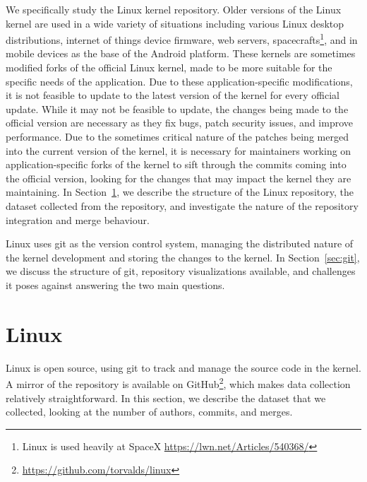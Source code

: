 We specifically study the Linux kernel repository. Older versions of the
Linux kernel are used in a wide variety of situations including various
Linux desktop distributions, internet of things device firmware, web
servers, spacecrafts\footnote{Linux is used heavily at SpaceX
  \url{https://lwn.net/Articles/540368/}}, and in mobile devices as the
base of the Android platform. These kernels are sometimes modified forks
of the official Linux kernel, made to be more suitable for the specific
needs of the application. Due to these application-specific
modifications, it is not feasible to update to the latest version of the
kernel for every official update. While it may not be feasible to
update, the changes being made to the official version are necessary as
they fix bugs, patch security issues, and improve performance. Due to
the sometimes critical nature of the patches being merged into the
current version of the kernel, it is necessary for maintainers working
on application-specific forks of the kernel to sift through the commits
coming into the official version, looking for the changes that may
impact the kernel they are maintaining. In Section~\ref{sec:linux}, we
describe the structure of the Linux repository, the dataset collected
from the repository, and investigate the nature of the repository
integration and merge behaviour.

Linux uses git as the version control system, managing the distributed
nature of the kernel development and storing the changes to the kernel.
In Section~\ref{sec:git}, we discuss the structure of git, repository
visualizations available, and challenges it poses against answering the
two main questions.

\section{Linux}\label{sec:linux}

Linux is open source, using git to track and manage the source code in
the kernel. A mirror of the repository is available on
GitHub\footnote{\url{https://github.com/torvalds/linux}}, which makes
data collection relatively straightforward. In this section, we describe
the dataset that we collected, looking at the number of authors,
commits, and merges.

